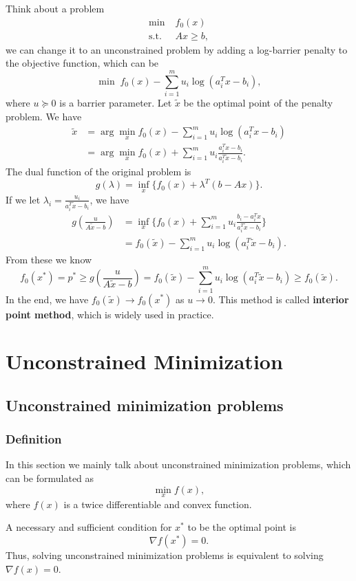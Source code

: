 \documentclass[lang=en,color=blue,mode=fancy,titlestyle=hang]{elegantbook}
\begin{document}
Think about a problem
\begin{align*}
\min \; &f_0(x)\\
\text{s.t.} \; &Ax \geq b,
\end{align*}
we can change it to an unconstrained problem by adding a log-barrier penalty to the objective function,
which can be
\[
\min \; f_0(x) - \sum_{i=1}^m u_i \log(a_i^T x - b_i),
\]
where $u \succeq 0$ is a barrier parameter. Let $\tilde{x}$ be the optimal point of the penalty problem.
We have
\begin{align*}
\tilde{x} &= \arg \min_x f_0(x) - \sum_{i=1}^m u_i \log(a_i^T x - b_i) \\
&= \arg \min_x f_0(x) + \sum_{i=1}^m u_i \frac{a_i^T x - b_i}{a_i^T \tilde{x} - b_i}.
\end{align*}
The dual function of the original problem is
\[
g(\lambda) = \inf_x \{f_0(x) + \lambda^T (b - Ax)\}.
\]
If we let $\lambda_i = \frac{u_i}{a_i^T \tilde{x} - b_i}$, we have
\begin{align*}
g(\frac{u}{A \tilde{x} - b}) &= \inf_x \{f_0(x) + \sum_{i=1}^m u_i \frac{b_i - a_i^T x}{a_i^T \tilde{x} - b_i}\}\\
&= f_0(\tilde{x}) - \sum_{i=1}^m u_i \log(a_i^T \tilde{x} - b_i).
\end{align*}
From these we know
\[
f_0(x^*) = p^* \geq g(\frac{u}{A \tilde{x} - b}) = f_0(\tilde{x}) - \sum_{i=1}^m u_i \log(a_i^T \tilde{x} - b_i) \geq f_0(\tilde{x}).
\]
In the end, we have $f_0(\tilde{x}) \to f_0(x^*)$ as $u \to 0$. This method is called \textbf{interior
point method}, which is widely used in practice.

\newpage
\chapter{Unconstrained Minimization}
\section{Unconstrained minimization problems}
\subsection{Definition}
In this section we mainly talk about unconstrained minimization problems, which can be formulated as
\[
\min_x f(x),
\]
where $f(x)$ is a twice differentiable and convex function.

A necessary and sufficient condition for $x^*$ to be the optimal point is
\[
\nabla f(x^*) = 0.
\]
Thus, solving unconstrained minimization problems is equivalent to solving $\nabla f(x) = 0$.
\end{document}
